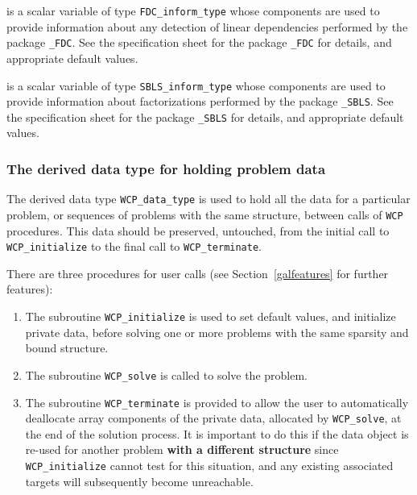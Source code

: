 \documentclass{galahad}
\newcommand{\packagename}{WCP}
\begin{document}
\begin{description}
 is a scalar variable of type 
{\tt FDC\_inform\_type}
whose components are used to provide information about 
any detection of linear dependencies
performed by the package 
{\tt \libraryname\_FDC}. 
See the specification sheet for the package 
{\tt \libraryname\_FDC} 
for details, and appropriate default values.

 is a scalar variable of type 
{\tt SBLS\_inform\_type}
whose components are used to provide information about factorizations
performed by the package 
{\tt \libraryname\_SBLS}. 
See the specification sheet for the package 
{\tt \libraryname\_SBLS} 
for details, and appropriate default values.

\end{description}


\subsubsection{The derived data type for holding problem data}\label{typedata}
The derived data type 
{\tt \packagename\_data\_type} 
is used to hold all the data for a particular problem,
or sequences of problems with the same structure, between calls of 
{\tt \packagename} procedures. 
This data should be preserved, untouched, from the initial call to 
{\tt \packagename\_initialize}
to the final call to
{\tt \packagename\_terminate}.


\galarguments
There are three procedures for user calls
(see Section~\ref{galfeatures} for further features): 

\begin{enumerate}
\item The subroutine 
      {\tt \packagename\_initialize} 
      is used to set default values, and initialize private data, 
      before solving one or more problems with the
      same sparsity and bound structure.
\item The subroutine 
      {\tt \packagename\_solve} 
      is called to solve the problem.
\item The subroutine 
      {\tt \packagename\_terminate} 
      is provided to allow the user to automatically deallocate array 
       components of the private data, allocated by 
       {\tt \packagename\_solve}, 
       at the end of the solution process. 
       It is important to do this if the data object is re-used for another 
       problem {\bf with a different structure}
       since {\tt \packagename\_initialize} cannot test for this situation, 
       and any existing associated targets will subsequently become unreachable.
\end{enumerate}
\end{document}
